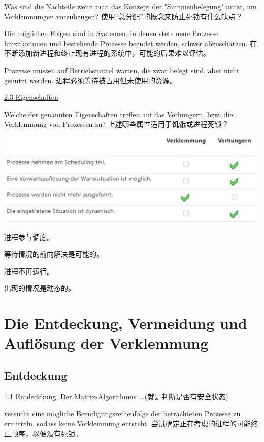 \documentclass[fleqn]{article}
\begin{document}
\noindent Was sind die Nachteile wenn man das Konzept der "Summenbelegung" nutzt, um Verklemmungen vorzubeugen?
使用“总分配”的概念来防止死锁有什么缺点？

Die möglichen Folgen sind in Systemen, in denen stets neue Prozesse hinzukommen und bestehende Prozesse beendet werden, schwer abzuschätzen.
在不断添加新进程和终止现有进程的系统中，可能的后果难以评估。

Prozesse müssen auf Betriebsmittel warten, die zwar belegt sind, aber nicht genutzt werden.
进程必须等待被占用但未使用的资源。

\noindent\uline{2.3 Eigenschaften}

\noindent Welche der genannten Eigenschaften treffen auf das Verhungern, bzw. die Verklemmung von Prozessen zu?
上述哪些属性适用于饥饿或进程死锁？

\begin{center}
    \includegraphics{31.png}
\end{center}

进程参与调度。

等待情况的前向解决是可能的。

进程不再运行。

出现的情况是动态的。



\section{Die Entdeckung, Vermeidung und Auflösung der Verklemmung}

\subsection{Entdeckung}

\noindent\uline{1.1	Entdedckung, Der Matrix-Algorithmus ...(就是判断是否有安全状态)}

versucht eine mögliche Beendigungsreihenfolge der betrachteten Prozesse zu ermitteln, sodass keine Verklemmung entsteht.
尝试确定正在考虑的进程的可能终止顺序，以便没有死锁。
\end{document}
